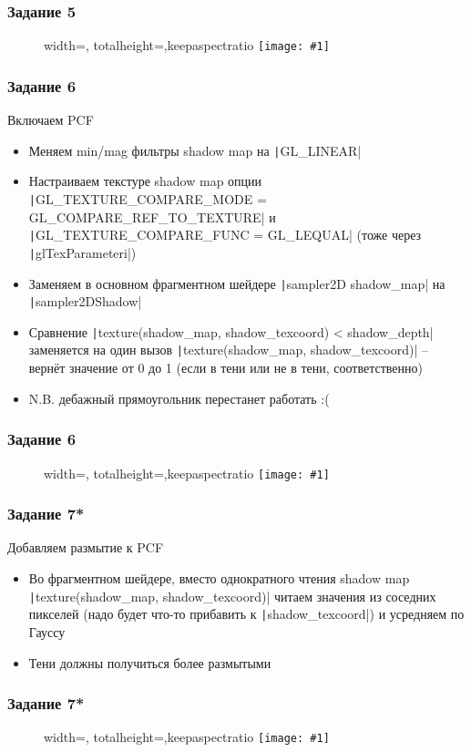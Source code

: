 \documentclass[10pt]{beamer}
\newcommand{\slideimage}[1]{
  \begin{figure}
    \begin{adjustbox}{width=\textwidth, totalheight=\textheight-2\baselineskip-2\baselineskip,keepaspectratio}
      \texttt{[image: \#1]}
    \end{adjustbox}
  \end{figure}
}
\begin{document}
\begin{frame}[fragile]
\frametitle{Задание 5}
\slideimage{5.png}
\end{frame}

\begin{frame}[fragile]
\frametitle{Задание 6}
\fontsize{10pt}{10pt}
Включаем PCF
\begin{itemize}
\item Меняем min/mag фильтры shadow map на \texttt|GL_LINEAR|
\item Настраиваем текстуре shadow map опции \texttt|GL_TEXTURE_COMPARE_MODE = GL_COMPARE_REF_TO_TEXTURE| и \texttt|GL_TEXTURE_COMPARE_FUNC = GL_LEQUAL| (тоже через \texttt|glTexParameteri|)
\item Заменяем в основном фрагментном шейдере \texttt|sampler2D shadow_map| на \texttt|sampler2DShadow|
\item Сравнение \texttt|texture(shadow_map, shadow_texcoord) < shadow_depth| заменяется на один вызов \texttt|texture(shadow_map, shadow_texcoord)| -- вернёт значение от 0 до 1 (если в тени или не в тени, соответственно)
\item N.B. дебажный прямоугольник перестанет работать :(
\end{itemize}
\end{frame}

\begin{frame}[fragile]
\frametitle{Задание 6}
\slideimage{6.png}
\end{frame}

\begin{frame}[fragile]
\frametitle{Задание 7*}
\fontsize{10pt}{10pt}
Добавляем размытие к PCF
\begin{itemize}
\item Во фрагментном шейдере, вместо однократного чтения shadow map \texttt|texture(shadow_map, shadow_texcoord)| читаем значения из соседних пикселей (надо будет что-то прибавить к \texttt|shadow_texcoord|) и усредняем по Гауссу
\item Тени должны получиться более размытыми
\end{itemize}
\end{frame}

\begin{frame}[fragile]
\frametitle{Задание 7*}
\slideimage{7.png}
\end{frame}
\end{document}
